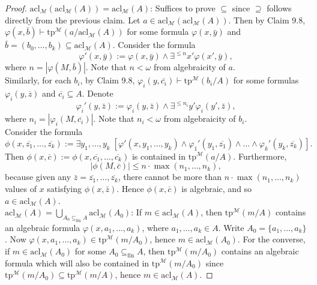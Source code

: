 \documentclass{article}
\begin{document}
\begin{enumerate}[label={\bf Q\arabic*:}]
\begin{proof}
      $\text{acl}_\mathcal{M}(\text{acl}_\mathcal{M}(A))
      =\text{acl}_\mathcal{M}(A)$: Suffices to prove $\subseteq$ since
      $\supseteq$ follows directly from the previous claim. Let
      $a\in\text{acl}_\mathcal{M}(\text{acl}_\mathcal{M}(A))$. Then by
      Claim 9.8, $\varphi(x,\bar{b})\vdash
      \text{tp}^{\mathcal{M}}(a/\text{acl}_\mathcal{M}(A))$ for some
      formula $\varphi(x,\bar{y})$ and $\bar{b}=(b_0,\ldots,b_k)\subseteq
      \text{acl}_\mathcal{M}(A)$. Consider the formula
      \[\varphi'(x,\bar{y}):= \varphi(x,\bar{y})\wedge \exists^{\leq
      n} x'\varphi(x',\bar{y}),\] where
      $n=|\varphi(M,\bar{b})|$. Note that $n<\omega$ from algebraicity of
      $a$. \\

      Similarly, for each $b_i$, by Claim
      9.8, $\varphi_i(y,\bar{c_i})\vdash \text{tp}^{\mathcal{M}}(b_i/A)$
      for some formulas $\varphi_i(y,\overline{z})$ and
      $\overline{c_i}\subseteq A$. Denote
      \[\varphi_i'(y,\bar{z}):= \varphi_i(y,\bar{z})\wedge \exists^{\leq
      n_i} y'\varphi_i(y',\bar{z}),\] where
      $n_i=|\varphi_i(M,\overline{c_i})|$. Note that $n_i<\omega$ from
      algebraicity of $b_i$. \\

      Consider the formula \[\phi(x,\overline{z_1},\ldots,\overline{z_k})
      :=\exists y_1,\ldots,y_k\; \left[\varphi'(x,y_1,\ldots,y_k)
      \wedge\varphi_1'(y_1,\overline{z_1})\wedge\ldots
      \wedge\varphi_k'(y_k,\overline{z_k})\right].\] Then
      $\phi(x,\overline{c}):= \phi(x,\overline{c_1},\ldots,\overline{c_k})$
      is contained in $\text{tp}^{\mathcal{M}}(a/A)$. Furthermore,
      \[|\phi(M,\bar{c})|\leq n\cdot\max(n_1,\ldots,n_k),\] because given
      any $\bar{z}=\overline{z_1},\ldots,\overline{z_k}$, there cannot be
      more than $n\cdot\max(n_1,\ldots,n_k)$ values of $x$ satisfying
      $\phi(x,\bar{z})$. Hence $\phi(x,\overline{c})$ is algebraic, and so
      $a\in\text{acl}_\mathcal{M}(A)$. \\

      $\text{acl}_\mathcal{M}(A) =\bigcup_{A_0\subseteq_{\text{fin}} A}
      \text{acl}_\mathcal{M}(A_0)$: If $m\in\text{acl}_\mathcal{M}(A)$,
      then $\text{tp}^\mathcal{M}(m/A)$ contains an algebraic formula
      $\varphi(x,a_1,\ldots,a_k)$, where $a_1,\ldots,a_k\in A$. Write
      $A_0=\{a_1,\ldots,a_k\}$. Now $\varphi(x,a_1,\ldots,a_k)
      \in\text{tp}^\mathcal{M}(m/A_0)$, hence
      $m\in\text{acl}_\mathcal{M}(A_0)$. For the converse, if
      $m\in\text{acl}_\mathcal{M}(A_0)$ for some $A_0\subseteq_{\text{fin}}
      A$, then $\text{tp}^\mathcal{M}(m/A_0)$ contains an algebraic formula
      which will also be contained in $\text{tp}^\mathcal{M}(m/A_0)$ since
      $\text{tp}^\mathcal{M}(m/A_0)\subseteq \text{tp}^\mathcal{M}(m/A)$,
      hence $m\in\text{acl}_\mathcal{M}(A)$. 
    \end{proof}


\end{enumerate}
\end{document}
